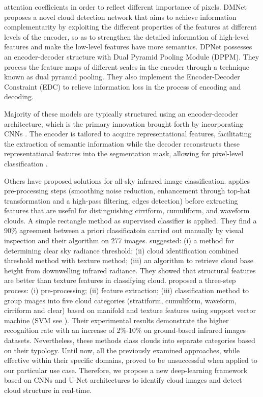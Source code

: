 \documentclass[amt, article]{copernicus}
\begin{document}
attention coefficients in order to reflect different importance of pixels. DMNet \citep{DMNet} proposes a novel cloud detection network that aims to achieve information complementarity by exploiting the different properties of the features at different levels of the encoder, so as to strengthen the detailed information of high-level features and make the low-level features have more semantics. DPNet \citep{DPNet} possesses an encoder-decoder structure with Dual Pyramid Pooling Module (DPPM). They process the feature maps of different scales in the encoder through a technique known as dual pyramid pooling. They also implement the Encoder-Decoder Constraint (EDC) to relieve information loss in the process of encoding and decoding.

Majority of these models are typically structured using an encoder-decoder architecture, which is the primary innovation brought forth by incorporating CNNs \citep{oshea2015introduction}. The encoder is tailored to acquire representational features, facilitating the extraction of semantic information while the decoder reconstructs these representational features into the segmentation mask, allowing for pixel-level classification \citep{badrinarayanan2017segnet, Alzubaidi2021ReviewOD}.

Others have proposed solutions for all-sky infrared image classification.
\citet{Liu2021} applies pre-processing steps (smoothing noise reduction, enhancement through top-hat transformation and a high-pass filtering, edges detection) before extracting features that are useful for distinguishing cirriform, cumuliform, and waveform clouds. A simple rectangle method as supervised classifier is applied. They find a 90\% agreement between a priori classificatoin carried out manually by visual inspection and their algorithm on 277 images. \citet{SUN2011278} suggested: (i) a method for determining clear sky radiance threshold; (ii) cloud identification combined threshold method with texture method; (iii) an algorithm to retrieve cloud base height from downwelling infrared radiance. They showed that structural features are better than texture features in classifying cloud. \citet{amt-11-5351-2018} proposed a three-step process: (i) pre-processing; (ii) feature extraction; (iii) classification method to group images into five cloud categories (stratiform, cumuliform, waveform, cirriform and clear) based on manifold and texture features using support vector machine (SVM see \citealt{cortes1995support}). Their experimental results demonstrate the higher recognition rate with an increase of 2\%-10\% on ground-based infrared images datasets. Nevertheless, these methods class clouds into separate categories based on their typology. Until now, all the previously examined approaches, while effective within their specific domains, proved to be unsuccessful when applied to our particular use case. Therefore, we propose a new deep-learning framework based on CNNs and U-Net architectures to identify cloud images and detect cloud structure in real-time.
\end{document}
